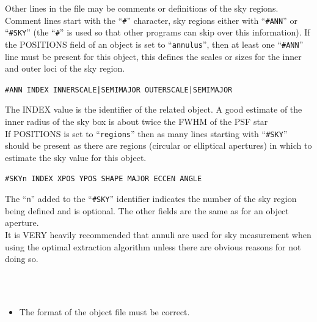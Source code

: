 \documentclass[twoside,11pt]{article}
\renewcommand{\_}{\texttt{\symbol{95}}}
\newcommand{\ft}[1]{``\texttt{#1}''}
\newcommand{\sstdiytopic}[2]{\item[{\hspace{-0.35em}#1\hspace{-0.35em}:}]
\mbox{} \\[1.3ex] #2}
\newcommand{\sstitemlist}[1]{
  \mbox{} \\
  \vspace{-3.5ex}
  \begin{itemize}
     #1
  \end{itemize}
}
\newcommand{\sstitem}{\item}
\newcommand{\sstdiytopic}[2]{\item[{#1}] #2 }
\newcommand{\sstitemlist}[1]{
      \begin{itemize}
         #1
      \end{itemize}
      \\
   }
\newcommand{\sstitem}{\item}
\begin{document}
{{{      Other lines in the file may be comments or definitions of the sky
      regions. Comment lines start with the \ft{\#} character, sky regions
      either with \ft{\#ANN} or \ft{\#SKY} (the \ft{\#} is used so that other
      programs can skip over this information). If the POSITIONS field
      of an object is set to \ft{annulus}, then at least one \ft{\#ANN} line must
      be present for this object, this defines the scales or sizes for
      the inner and outer loci of the sky region.
       \begin{description}
          \item  \hspace*{1cm} \texttt{\#ANN INDEX INNER\_SCALE|SEMI\_MAJOR OUTER\_SCALE|SEMI\_MAJOR}
       \end{description}
      The INDEX value is the identifier of the related object. A good
      estimate of the inner radius of the sky box is about twice the
      FWHM of the PSF star\\

      If POSITIONS is set to \ft{regions} then as many lines starting with
      \ft{\#SKY} should be present as there are regions (circular or
      elliptical apertures) in which to estimate the sky value for this
      object.
       \begin{description}
          \item  \hspace*{1cm} \texttt{\#SKYn INDEX XPOS YPOS SHAPE MAJOR ECCEN
                                        ANGLE}
       \end{description}
      The \ft{n} added to the \ft{\#SKY} identifier indicates the number of
      the sky region being defined and is optional. The other fields
      are the same as for an object aperture.\\

      It is VERY heavily recommended that annuli are used for sky measurement
      when using the optimal extraction algorithm unless there are obvious
      reasons for not doing so.

    }
   }
   \sstdiytopic{
      Pitfalls
   }{
      \sstitemlist{
         \sstitem
         The format of the object file must be correct.
      }
   }
}
\newpage
\end{document}
